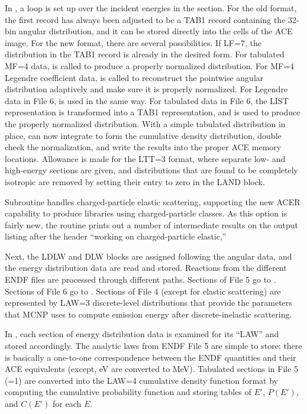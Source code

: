 In , a loop is set up
over the incident energies in the section.  For the old format,
the first record has always been adjusted to be a TAB1 record
containing the 32-bin angular distribution, and it can be
stored directly into the cells of the ACE image.  For the
new format, there are several possibilities.
If LF=7, the distribution in the TAB1 record is already in the
desired form.  For tabulated MF=4 data,
 is called to produce a properly
normalized distribution.  For MF=4 Legendre coefficient data,
 is called to reconstruct
the pointwise angular distribution adaptively and make sure it is
properly normalized.  For Legendre data in File 6, 
is used in the same way.  For tabulated data in File 6, the LIST
representation is transformed into a TAB1 representation, and
 is used to produce the properly
normalized distribution.  With a simple tabulated distribution
in place,  can now integrate to form the cumulative density
distribution, double check the normalization, and write the
results into the proper ACE memory locations.  Allowance is made
for the LTT=3 format, where separate low- and high-energy
sections are given, and distributions that are found to be completely
isotropic are removed by setting their entry to zero in the LAND
block.

Subroutine  handles
charged-particle elastic scattering, supporting the new ACER
capability to produce libraries using charged-particle classes.
As this option is fairly new, the routine prints out a
number of intermediate results on the output listing after the
header ``working on charged-particle elastic,''

Next, the LDLW and DLW blocks are assigned following the angular data,
and the energy distribution data are read and stored.  Reactions
from the different ENDF files are processed through different paths.
Sections of File 5 go to .  Sections
of File 6 go to .  Sections
of File 4 (except for elastic scattering) are represented by LAW=3
discrete-level distributions that provide the parameters that
MCNP uses to compute emission energy after discrete-inelastic scattering.

In , each section of
energy distribution data is examined for its ``LAW'' and stored
accordingly.  The analytic laws from ENDF File 5 are simple to
store; there is basically a one-to-one correspondence between
the ENDF quantities and their ACE equivalents (except, eV are
converted to MeV).  Tabulated sections in File 5 (=1)
are converted into the LAW=4 cumulative density function format
by computing the cumulative probability function and storing
tables of $E'$, $P(E')$, and $C(E')$ for each $E$.

